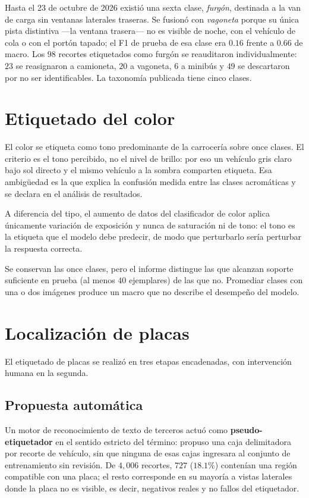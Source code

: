 Hasta el 23 de octubre de 2026 existió una sexta clase, \textit{furgón}, destinada
a la van de carga sin ventanas laterales traseras. Se fusionó con
\textit{vagoneta} porque su única pista distintiva ---la ventana trasera--- no es
visible de noche, con el vehículo de cola o con el portón tapado; el F1 de prueba
de esa clase era $0{.}16$ frente a $0{.}66$ de macro. Los $98$ recortes
etiquetados como furgón se reauditaron individualmente: $23$ se reasignaron a
camioneta, $20$ a vagoneta, $6$ a minibús y $49$ se descartaron por no ser
identificables. La taxonomía publicada tiene cinco clases.

\section{Etiquetado del color}

El color se etiqueta como tono predominante de la carrocería sobre once clases. El
criterio es el tono percibido, no el nivel de brillo: por eso un vehículo gris
claro bajo sol directo y el mismo vehículo a la sombra comparten etiqueta. Esa
ambigüedad es la que explica la confusión medida entre las clases acromáticas y se
declara en el análisis de resultados.

A diferencia del tipo, el aumento de datos del clasificador de color aplica
únicamente variación de exposición y nunca de saturación ni de tono: el tono es la
etiqueta que el modelo debe predecir, de modo que perturbarlo sería perturbar la
respuesta correcta.

Se conservan las once clases, pero el informe distingue las que alcanzan soporte
suficiente en prueba (al menos $40$ ejemplares) de las que no. Promediar clases con
una o dos imágenes produce un macro que no describe el desempeño del modelo.

\section{Localización de placas}

El etiquetado de placas se realizó en tres etapas encadenadas, con intervención
humana en la segunda.

\subsection{Propuesta automática}

Un motor de reconocimiento de texto de terceros actuó como
\textbf{pseudo-etiquetador} en el sentido estricto del término: propuso una caja
delimitadora por recorte de vehículo, sin que ninguna de esas cajas ingresara al
conjunto de entrenamiento sin revisión. De $4{,}006$ recortes, $727$ ($18{.}1\%$)
contenían una región compatible con una placa; el resto corresponde en su mayoría
a vistas laterales donde la placa no es visible, es decir, negativos reales y no
fallos del etiquetador.

